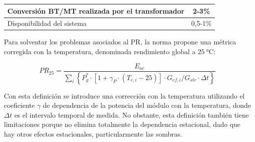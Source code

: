 \begin{table}
\begin{tabular}{>{\centering}p{8cm}c}
                                                                                                                                                                                                                                       \midrule 
                                                                                                                                                                                                                                       Conversión BT/MT realizada por el transformador & 2-3\%\tabularnewline
                                                                                                                                                                                                                                                                                         \midrule 
                                                                                                                                                                                                                                                                                         Disponibilidad del sistema  & 0,5-1\%\tabularnewline
                                                                                                                                                                                                                                                                                                                       \bottomrule
\end{tabular}
\end{table}

Para solventar los problemas asociados al PR, la norma propone una métrica corregida con la temperatura, denominada rendimiento global a $\qty{25}{\celsius}$:

\begin{equation}
  \label{eq:PR25}
  PR_{25} = \frac{E_{ac}}{\sum_i \left\{P_g^* \cdot \left[1 + \gamma_P \cdot(T_{c,i} - 25)\right]\cdot G_{ef,i}/G_{stc} \cdot \Delta t \right\}}
\end{equation}

Con esta definición se introduce una corrección con la temperatura utilizando el coeficiente $\gamma$ de dependencia de la potencia del módulo con la temperatura, donde $\Delta t$ es el intervalo temporal de medida. No obstante, esta definición también tiene limitaciones porque no elimina totalmente la dependencia estacional, dado que hay otros efectos estacionales, particularmente las sombras.

